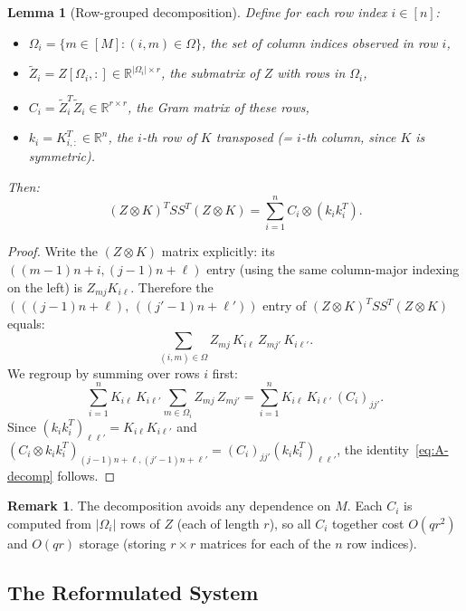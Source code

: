 \documentclass[12pt]{article}
\newtheorem{lemma}{Lemma}
\theoremstyle{definition}
\newtheorem{remark}{Remark}
\begin{document}
\begin{lemma}[Row-grouped decomposition]\label{lem:row-group}
Define for each row index $i \in [n]$:
\begin{itemize}
\item $\Omega_i = \{m \in [M] : (i,m) \in \Omega\}$, the set of column indices observed in row $i$,
\item $\tilde{Z}_i = Z[\Omega_i, :] \in \mathbb{R}^{|\Omega_i| \times r}$, the submatrix of $Z$ with rows in $\Omega_i$,
\item $C_i = \tilde{Z}_i^T \tilde{Z}_i \in \mathbb{R}^{r \times r}$, the Gram matrix of these rows,
\item $k_i = K_{i,:}^T \in \mathbb{R}^n$, the $i$-th row of $K$ transposed (= $i$-th column, since $K$ is symmetric).
\end{itemize}
Then:
\begin{equation}\label{eq:A-decomp}
(Z \otimes K)^T SS^T (Z \otimes K) = \sum_{i=1}^n C_i \otimes (k_i k_i^T).
\end{equation}
\end{lemma}

\begin{proof}
Write the $(Z \otimes K)$ matrix explicitly: its $((m-1)n+i, (j-1)n+\ell)$ entry (using the same column-major indexing on the left) is $Z_{mj} K_{i\ell}$. Therefore the $(((j-1)n+\ell),\,((j'-1)n+\ell'))$ entry of $(Z\otimes K)^T SS^T (Z\otimes K)$ equals:
\[
\sum_{(i,m)\in\Omega} Z_{mj}\,K_{i\ell}\,Z_{mj'}\,K_{i\ell'}.
\]
We regroup by summing over rows $i$ first:
\[
\sum_{i=1}^n K_{i\ell}\,K_{i\ell'} \sum_{m\in\Omega_i} Z_{mj}\,Z_{mj'}
= \sum_{i=1}^n K_{i\ell}\,K_{i\ell'}\,(C_i)_{jj'}.
\]
Since $(k_ik_i^T)_{\ell\ell'} = K_{i\ell}K_{i\ell'}$ and $(C_i \otimes k_ik_i^T)_{(j-1)n+\ell,(j'-1)n+\ell'} = (C_i)_{jj'}(k_ik_i^T)_{\ell\ell'}$, the identity~\eqref{eq:A-decomp} follows.
\end{proof}

\begin{remark}
The decomposition avoids any dependence on $M$. Each $C_i$ is computed from $|\Omega_i|$ rows of $Z$ (each of length $r$), so all $C_i$ together cost $O(qr^2)$ and $O(qr)$ storage (storing $r\times r$ matrices for each of the $n$ row indices).
\end{remark}

\subsection{The Reformulated System}
\end{document}
